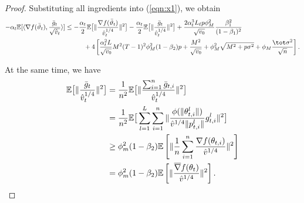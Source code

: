 \documentclass[nohyperref]{article}
\begin{document}
\begin{proof}
Substituting all ingredients into (\ref{eqn:x1}), we obtain
\begin{align}\notag
    -\alpha_t \mathbb E[\langle \nabla f(\bar \vartheta_t),\frac{\bar g_t}{\sqrt{\hat v_t}} \rangle] &\leq -\frac{\alpha_t}{2}\mathbb E\big[\Vert \frac{\nabla f(\bar\vartheta_t) }{\hat v_t^{1/4}}\Vert^2 \big]-\frac{\alpha_t}{2}\mathbb E\big[\Vert \frac{\bar g_t }{\hat v_t^{1/4}}\Vert^2 \big]+\frac{2\alpha_t^3 L_\ell p\phi_M^2}{ \sqrt{v_0}}\frac{\beta_1^2}{(1-\beta_1)^2} \\\notag
    &\hspace{0.4in}  + 4 \left[ \frac{\alpha_t^2 L}{\sqrt{v_0}} M^2 (T-1)^2 \phi_M^2 (1-\beta_2)p + \frac{M^2}{\sqrt{v_0}}+\phi_M^2\sqrt{M^2+p\sigma^2} + \phi_M \frac{\tot \sigma^2}{\sqrt{n}}\right].
\end{align}


At the same time, we have
\begin{align}\notag
    \mathbb E\big[\Vert \frac{\bar g_t }{\hat v_t^{1/4}}\Vert^2\big]&=\frac{1}{n^2}\mathbb E\big[\Vert \frac{\sum_{i=1}^n \bar g_{t,i}}{\hat v_t^{1/4}}\Vert^2 \big]\\\notag
    &=\frac{1}{n^2}\mathbb E\big[ \sum_{l=1}^L \sum_{i=1}^n \Vert  \frac{\phi(\Vert \theta_{t,i}^l\Vert)}{\hat v^{1/4} \Vert p_{t,i}^l\Vert}g_{t,i}^l \Vert^2 \big]\\\notag
    &\geq \phi_m^2(1-\beta_2) \mathbb E\left[ \Vert \frac{1}{n}\sum_{i=1}^n \frac{\nabla f(\theta_{t,i})}{\hat v^{1/4}} \Vert^2 \right]\\\notag
    &=\phi_m^2(1-\beta_2) \mathbb E\left[ \Vert  \frac{\overline\nabla f(\theta_{t})}{\hat v^{1/4}} \Vert^2 \right].
\end{align}




\end{proof}
\end{document}
